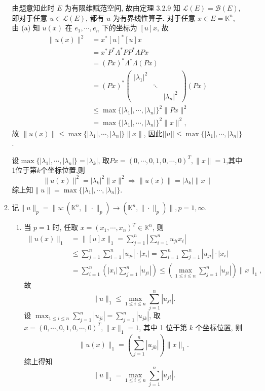 \begin{enumerate}
\begin{answer}
\begin{enumerate}
        由题意知此时 $E$ 为有限维赋范空间, 故由定理 3.2.9 知 $\mathcal{L}(E)=\mathcal{B}(E)$,
        即对于任意 $u\in\mathcal{L}(E)$, 都有 $u$ 为有界线性算子.
        对于任意 $x\in E=\mathbb{K}^n$, 由 (a) 知 $u(x)$ 在 $e_1,\cdots,e_n$
        下的坐标为 $[u]x$, 故
        \begin{align*}
            \|u(x)\|^2
            & =x^{*}[u]^{*}[u]x\\
            & =x^{*}P^{*}\Lambda^{*}PP^{*}\Lambda Px\\
            & =(Px)^{*}\Lambda^{*}\Lambda(Px)\\
            & =(Px)^{*}\begin{pmatrix}|\lambda_1|^2& & \\ &\ddots& \\ & & |\lambda_n|^2\end{pmatrix}(Px)\\
            & \leq\max\{|\lambda_1|,\cdots,|\lambda_n|\}^2\|Px\|^2\\&=\max\{|\lambda_1|,\cdots,|\lambda_n|\}^2\|x\|^2,
        \end{align*}
        故 $\|u(x)\|\leq \max\{|\lambda_1|,\cdots,|\lambda_n|\}\|x\|$, 因此$||u||\leq \max\{|\lambda_1|,\cdots,|\lambda_n|\}$.
        
        设$\max\{|\lambda_1|,\cdots,|\lambda_n|\}=|\lambda_k|$, 取$Px=(0,\cdots,0,1,0,\cdots,0)^T,\|x\|=1$,其中1位于第$k$个坐标位置,则
        \[\|u(x)\|^2=|\lambda_k|^2\|x\|^2\Rightarrow \|u(x)\|=|\lambda_k|\|x\|\]
        综上知$\|u\|=\max\{|\lambda_1|,\cdots,|\lambda_n|\}$.
        
        \item 记$\|u\|_p=\|u:(\mathbb{K}^n,\|\cdot\|_p)\to(\mathbb{K}^n,\|\cdot\|_p)\|,p=1,\infty$.
        
          \begin{enumerate}
            \item 当 $p=1$ 时, 任取 $x=(x_1,\cdots,x_n)^T\in\mathbb{K}^n$, 则
            \[\begin{split}\|u(x)\|_1
            &=\|[u]x\|_1=\sum_{j=1}^n\left|\sum_{i=1}^nu_{ji}x_i\right|\\
            &\leq \sum_{j=1}^n\sum_{i=1}^n|u_{ji}|\cdot|x_i|=\sum_{i=1}^n\sum_{j=1}^n|u_{ji}|\cdot|x_i|\\
            &=\sum_{i=1}^n\left(|x_i|\sum_{j=1}^n|u_{ji}|\right)\leq\left(\max\limits_{1\leq i\leq n}\sum_{j=1}^n|u_{ji}|\right)\|x\|_1,
            \end{split}\]
            故
            \[\|u\|_1\leq \max\limits_{1\leq i\leq n}\sum_{j=1}^n|u_{ji}|.\]
            设 $\max_{1\leq i\leq n}\sum_{j=1}^n|u_{ji}|=\sum_{j=1}^n|u_{jk}|$, 
            取 $x=(0,\cdots,0,1,0,\cdots,0)^T,\|x\|_1=1$, 其中 1 位于第 $k$ 个坐标位置, 则
            \[\|u(x)\|_1=\left(\sum_{j=1}^n|u_{jk}|\right)\|x\|_1.\]
            综上得知
            \[\|u\|_1=\max\limits_{1\leq i\leq n}\sum_{j=1}^n|u_{ji}|.\]
            

\end{enumerate}
\end{enumerate}
\end{answer}
\end{enumerate}
